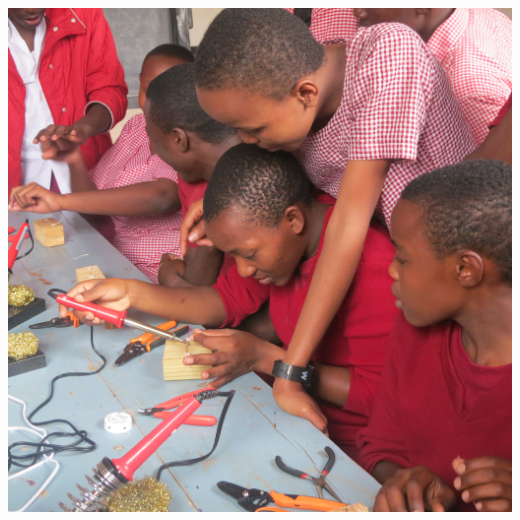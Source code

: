 \documentclass[11pt, twocolumn]{article}
\begin{document}
\includegraphics[width=\columnwidth]{more_teachers.jpg}
\end{document}
